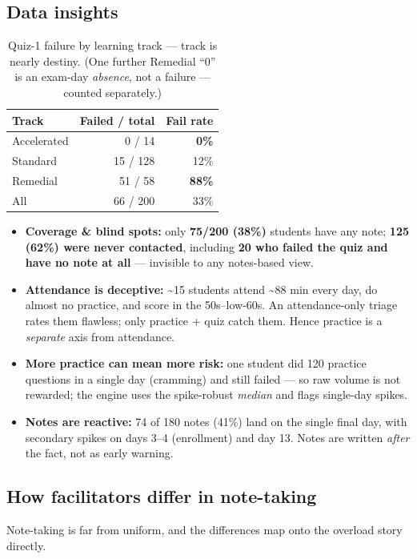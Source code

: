 \documentclass[11pt,paper=a4,parskip=half,DIV=11]{scrartcl}
\begin{document}
\subsection{Data insights}
\begin{table}[h]\centering\footnotesize
\caption{Quiz-1 failure by learning track --- track is nearly destiny. (One further
Remedial ``0'' is an exam-day \emph{absence}, not a failure --- counted separately.)}
\begin{tabular}{lrr}
\toprule
Track & Failed / total & Fail rate \\
\midrule
Accelerated & 0 / 14 & \textbf{0\%} \\
Standard & 15 / 128 & 12\% \\
Remedial & 51 / 58 & \textbf{88\%} \\
\midrule
All & 66 / 200 & 33\% \\
\bottomrule
\end{tabular}
\end{table}

\begin{itemize}
\item \textbf{Coverage \& blind spots:} only \textbf{75/200 (38\%)} students have any note; \textbf{125 (62\%)
were never contacted}, including \textbf{20 who failed the quiz and have no note at all} --- invisible to
any notes-based view.
\item \textbf{Attendance is deceptive:} \textasciitilde15 students attend \textasciitilde88 min every day,
do almost no practice, and score in the 50s--low-60s. An attendance-only triage rates them flawless;
only practice + quiz catch them. Hence practice is a \emph{separate} axis from attendance.
\item \textbf{More practice can mean more risk:} one student did 120 practice questions in a single day
(cramming) and still failed --- so raw volume is not rewarded; the engine uses the spike-robust
\emph{median} and flags single-day spikes.
\item \textbf{Notes are reactive:} 74 of 180 notes (41\%) land on the single final day, with secondary
spikes on days 3--4 (enrollment) and day 13. Notes are written \emph{after} the fact, not as early warning.
\end{itemize}

\subsection{How facilitators differ in note-taking}
Note-taking is far from uniform, and the differences map onto the overload story directly.
\end{document}
